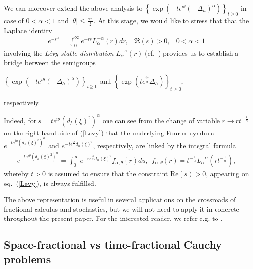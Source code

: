\documentclass{elsarticle}
\begin{document}
We can moreover extend the above analysis to $\left\{\exp\left(-te^{i\theta}(-\Delta_h)^\alpha\right)\right\}_{t\geq 0}$ in case of $0<\alpha<1$ and $|\theta|\leq \frac{\alpha \pi}{2}$. At this stage, we would like to stress that that the Laplace identity
\begin{eqnarray}
	\label{Levy}e^{-s^\alpha}=\int_{0}^\infty e^{-rs}L_\alpha^{-\alpha}(r)dr, & \Re(s)>0, & 0<\alpha<1
\end{eqnarray}
involving the {\it L\'evy stable distribution} $L_\alpha^{-\alpha}(r)$ (cf.~\cite[Section 4]{Mainardi01}) provides us to establish a bridge between the semigroups
\begin{center}
	$\left\{\exp\left(-te^{i\theta}(-\Delta_h)^\alpha\right)\right\}_{t\geq 0}$ and $\left\{\exp\left(te^{\frac{i\theta}{\alpha}}\Delta_h\right)\right\}_{t\geq 0}$,
\end{center}
respectively.

Indeed, for $s=te^{i\theta}(d_h(\xi)^2)^\alpha$ one can see from the change of variable $r\rightarrow rt^{-\frac{1}{\alpha}}$ on the right-hand side of (\ref{Levy}) that the underlying Fourier symbols $e^{-te^{i\theta}(d_h(\xi)^2)^\alpha}$ and $e^{-te^{\frac{i\theta}{\alpha}}d_h(\xi)^2}$, respectively, are linked by the integral formula
\begin{eqnarray*}
	e^{-te^{i\theta}(d_h(\xi)^2)^\alpha}=\int_{0}^{\infty} e^{-re^{\frac{i\theta}{\alpha}}d_h(\xi)^2}f_{\alpha,\theta}(r) du,~~f_{\alpha,\theta}(r)=t^{-\frac{1}{\alpha}}L_\alpha^{-\alpha}\left(rt^{-\frac{1}{\alpha}}\right),
\end{eqnarray*}
whereby $t>0$ is assumed to ensure that the constraint $\mbox{Re}(s)>0$, appearing on eq.~(\ref{Levy}), is always fulfilled.

The above representation is useful in several applications on the crossroads of fractional calculus and stochastics, but we will not need to apply it in concrete throughout the present paper. For the interested reader, we refer e.g. to \cite[Chapter 3 \& Chapter 6]{MS12}.



\subsection{Space-fractional vs time-fractional Cauchy problems}
\end{document}
